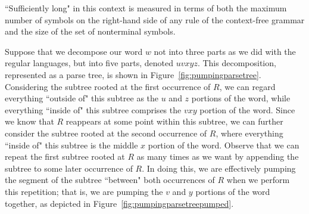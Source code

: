 \begin{remark}
``Sufficiently long" in this context is measured in terms of both the maximum number of symbols on the right-hand side of any rule of the context-free grammar and the size of the set of nonterminal symbols.
\end{remark}

Suppose that we decompose our word $w$ not into three parts as we did with the regular languages, but into five parts, denoted $uvxyz$. This decomposition, represented as a parse tree, is shown in Figure~\ref{fig:pumpingparsetree}. Considering the subtree rooted at the first occurrence of $R$, we can regard everything ``outside of" this subtree as the $u$ and $z$ portions of the word, while everything ``inside of" this subtree comprises the $vxy$ portion of the word. Since we know that $R$ reappears at some point within this subtree, we can further consider the subtree rooted at the second occurrence of $R$, where everything ``inside of" this subtree is the middle $x$ portion of the word. Observe that we can repeat the first subtree rooted at $R$ as many times as we want by appending the subtree to some later occurrence of $R$. In doing this, we are effectively pumping the segment of the subtree ``between" both occurrences of $R$ when we perform this repetition; that is, we are pumping the $v$ and $y$ portions of the word together, as depicted in Figure~\ref{fig:pumpingparsetreepumped}.

